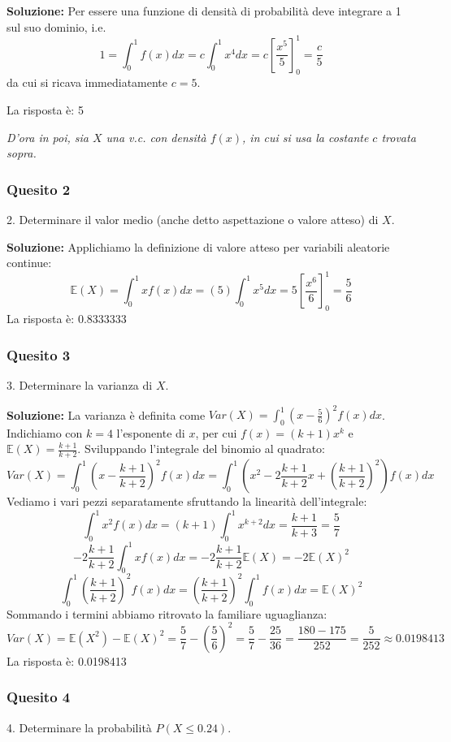 \documentclass[12pt, a4paper]{article}
\begin{document}
\textbf{Soluzione:}
Per essere una funzione di densità di probabilità deve integrare a 1 sul suo dominio, i.e.
$$ 1 = \int_0^1 f(x) dx = c \int_0^1 x^4 dx = c \left[ \frac{x^5}{5} \right]_0^1 = \frac{c}{5} $$
da cui si ricava immediatamente $c=5$.

La risposta è: 5

\vspace{0.3cm}
\textit{D’ora in poi, sia $X$ una v.c. con densità $f(x)$, in cui si usa la costante $c$ trovata sopra.}

\subsubsection*{Quesito 2}
2. Determinare il valor medio (anche detto aspettazione o valore atteso) di $X$.

\textbf{Soluzione:}
Applichiamo la definizione di valore atteso per variabili aleatorie continue:
$$ \mathbb{E}(X) = \int_0^1 x f(x) dx = (5) \int_0^1 x^5 dx = 5 \left[ \frac{x^6}{6} \right]_0^1 = \frac{5}{6} $$
La risposta è: 0.8333333

\subsubsection*{Quesito 3}
3. Determinare la varianza di $X$.

\textbf{Soluzione:}
La varianza è definita come $Var(X) = \int_0^1 \left(x - \frac{5}{6}\right)^2 f(x) dx$. 
Indichiamo con $k=4$ l’esponente di $x$, per cui $f(x) = (k+1)x^k$ e $\mathbb{E}(X) = \frac{k+1}{k+2}$. 
Sviluppando l'integrale del binomio al quadrato:
$$ Var(X) = \int_0^1 \left(x - \frac{k+1}{k+2}\right)^2 f(x) dx = \int_0^1 \left( x^2 - 2\frac{k+1}{k+2}x + \left(\frac{k+1}{k+2}\right)^2 \right) f(x) dx $$
Vediamo i vari pezzi separatamente sfruttando la linearità dell'integrale:
$$ \int_0^1 x^2 f(x) dx = (k+1) \int_0^1 x^{k+2} dx = \frac{k+1}{k+3} = \frac{5}{7} $$
$$ -2\frac{k+1}{k+2} \int_0^1 x f(x) dx = -2\frac{k+1}{k+2} \mathbb{E}(X) = -2\mathbb{E}(X)^2 $$
$$ \int_0^1 \left(\frac{k+1}{k+2}\right)^2 f(x) dx = \left(\frac{k+1}{k+2}\right)^2 \int_0^1 f(x) dx = \mathbb{E}(X)^2 $$
Sommando i termini abbiamo ritrovato la familiare uguaglianza:
$$ Var(X) = \mathbb{E}(X^2) - \mathbb{E}(X)^2 = \frac{5}{7} - \left(\frac{5}{6}\right)^2 = \frac{5}{7} - \frac{25}{36} = \frac{180 - 175}{252} = \frac{5}{252} \approx 0.0198413 $$
La risposta è: 0.0198413

\subsubsection*{Quesito 4}
4. Determinare la probabilità $P(X \leq 0.24)$.
\end{document}

